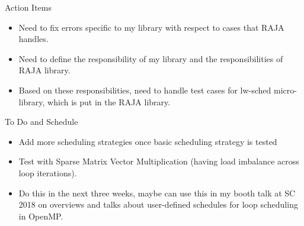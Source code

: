 \documentclass{beamer}
\begin{document}
\begin{frame}{Action Items}
\begin{itemize}
\item Need to fix errors specific to my library with respect to cases that RAJA handles. 
\item Need to define the responsibility of my library and the responsibilities of RAJA library.
\item Based on these responsibilities, need to handle test cases for lw-sched micro-library, which is put in the RAJA library. 
\end{itemize}
\end{frame}

\begin{frame}{To Do and Schedule}
\begin{itemize}
\item Add more scheduling strategies once basic scheduling strategy is tested
\item Test with Sparse Matrix Vector Multiplication (having load imbalance across loop iterations).
\item Do this in the next three weeks, maybe can use this in my booth talk at SC 2018 on overviews and talks about user-defined schedules for loop scheduling in OpenMP.
\end{itemize}
\end{frame}
\end{document}

